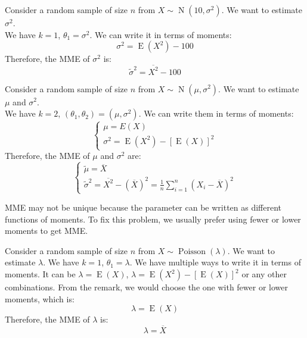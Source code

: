 \documentclass{huhtakm-template-book-v2}
\DeclareMathOperator{\E}{E}
\DeclareMathOperator{\Poisson}{Poisson}
\DeclareMathOperator{\N}{N}
\begin{document}
\newpage
\begin{eg}
	Consider a random sample of size $n$ from $X\sim\N(10,\sigma^{2})$. We want to estimate $\sigma^{2}$.\\
	We have $k=1$, $\theta_{1}=\sigma^{2}$. We can write it in terms of moments:
	\begin{equation*}
		\sigma^{2}=\E(X^{2})-100
	\end{equation*}
	Therefore, the MME of $\sigma^{2}$ is:
	\begin{equation*}
		\tilde{\sigma}^{2}=\overline{X^{2}}-100
	\end{equation*}
\end{eg}
\begin{eg}
	Consider a random sample of size $n$ from $X\sim\N(\mu,\sigma^{2})$. We want to estimate $\mu$ and $\sigma^{2}$.\\
	We have $k=2$, $(\theta_{1},\theta_{2})=(\mu,\sigma^{2})$. We can write them in terms of moments: 
	\begin{equation*}
		\begin{cases}
			\mu=E(X)\\
			\sigma^{2}=\E(X^{2})-[\E(X)]^{2}
		\end{cases}
	\end{equation*}
	Therefore, the MME of $\mu$ and $\sigma^{2}$ are:
	\begin{equation*}
		\begin{cases}
			\tilde{\mu}=\overline{X}\\
			\tilde{\sigma}^{2}=\overline{X^{2}}-(\overline{X})^{2}=\frac{1}{n}\sum_{i=1}^{n}(X_{i}-\overline{X})^{2}
		\end{cases}
	\end{equation*}
\end{eg}
\begin{rem}
	MME may not be unique because the parameter can be written as different functions of moments. To fix this problem, we usually prefer using fewer or lower moments to get MME.
\end{rem}
\begin{eg}
	Consider a random sample of size $n$ from $X\sim\Poisson(\lambda)$. We want to estimate $\lambda$. We have $k=1$, $\theta_{1}=\lambda$. We have multiple ways to write it in terms of moments. It can be $\lambda=\E(X)$, $\lambda=\E(X^{2})-[\E(X)]^{2}$ or any other combinations. From the remark, we would choose the one with fewer or lower moments, which is:
	\begin{equation*}
		\lambda=\E(X)
	\end{equation*}
	Therefore, the MME of $\lambda$ is:
	\begin{equation*}
		\lambda=\overline{X}
	\end{equation*}
\end{eg}
\end{document}
